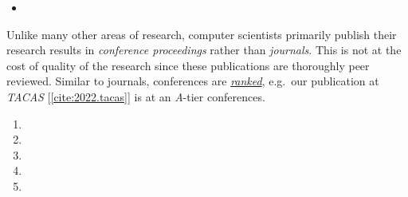 \newpage
{}


  


  \begin{itemize}
  \item 
  \end{itemize}

\begin{fullwidth}


  Unlike many other areas of research, computer scientists primarily publish their research results
  in \emph{conference proceedings} rather than \emph{journals}. This is not at the cost of quality
  of the research since these publications are thoroughly peer reviewed. Similar to journals,
  conferences are \href{https://portal.core.edu.au/conf-ranks/}{\emph{ranked}}, e.g.\ our
  publication at \emph{TACAS} [\ref{cite:2022.tacas}] is at an \emph{A}-tier conferences.

  \medskip

  \divider


  \begin{enumerate} \normalsize
  \item  \divider
  \item  \divider
  \item  \divider
  \item  \divider
  \item 
  \end{enumerate}
\end{fullwidth}


